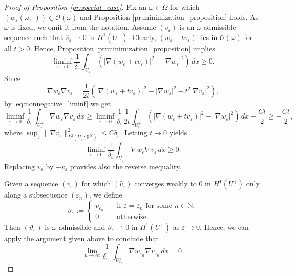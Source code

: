 \documentclass{article}
\numberwithin{equation}{section}
\theoremstyle{definition}
\theoremstyle{remark}
\begin{document}
\begin{proof}[Proof of Proposition \ref{pr:special_case}]
    Fix an $\omega \in \Omega$ for which $(w_\varepsilon(\omega, \cdot)) \in \mathcal{O}(\omega)$ and Proposition \ref{pr:minimization_proposition} holds. As $\omega$ is fixed, we omit it from the notation. Assume $(v_\varepsilon)$ is an $\omega$-admissible sequence such that $\hat{v}_\varepsilon \rightharpoonup 0$ in $H^1(U^+)$. Clearly, $(w_\varepsilon + tv_\varepsilon)$ lies in $\mathcal{O}(\omega)$ for all $t > 0$. Hence, Proposition \ref{pr:minimization_proposition} implies
        \begin{equation} \label{eq:nonnegative_liminf}
            \liminf_{\varepsilon \to 0} \frac{1}{\delta_\varepsilon} \int_{U_\varepsilon^+} (|\nabla (w_\varepsilon + tv_\varepsilon)|^2 - |\nabla w_\varepsilon|^2) \, dx \ge 0.
        \end{equation}
    Since
    \[
    \nabla w_\varepsilon \nabla v_\varepsilon = \frac{1}{2t}\left(|\nabla (w_\varepsilon + tv_\varepsilon)|^2 - |\nabla w_\varepsilon|^2 - t^2|\nabla v_\varepsilon|^2\right),
    \]
    by \eqref{eq:nonnegative_liminf} we get
    \[
    \liminf_{\varepsilon \to 0} \frac{1}{\delta_\varepsilon} \int_{U_\varepsilon^+} \nabla w_\varepsilon \nabla v_\varepsilon \, dx \ge \liminf_{\varepsilon \to 0} \frac{1}{\delta_\varepsilon} \frac{1}{2t} \int_{U_\varepsilon^+} (|\nabla (w_\varepsilon + tv_\varepsilon)|^2 - |\nabla w_\varepsilon|^2) \, dx - \frac{Ct}{2} \ge -\frac{Ct}{2},
    \]
    where $\sup_{\varepsilon} \|\nabla v_\varepsilon\|_{L^2(U_\varepsilon^+; \mathbb{R}^N)}^2 \le C \delta_\varepsilon$. Letting $t \to 0$ yields
    \[
    \liminf_{\varepsilon \to 0} \frac{1}{\delta_\varepsilon} \int_{U_\varepsilon^+} \nabla w_\varepsilon \nabla v_\varepsilon \, dx \ge 0.
    \]
    Replacing $v_\varepsilon$ by $-v_\varepsilon$ provides also the reverse inequality.

    Given a sequence $(v_\varepsilon)$ for which $(\hat{v}_\varepsilon)$ converges weakly to $0$ in $H^1(U^+)$ only along a subsequence $(\varepsilon_n)$, we define
    \[
    \vartheta_\varepsilon :=
        \begin{cases}
            v_{\varepsilon_n} \quad &\text{if } \varepsilon = \varepsilon_n \text{ for some } n \in \mathbb{N}, \\
            0 \quad &\text{otherwise}.
        \end{cases}
    \]
    Then $(\vartheta_\varepsilon)$ is $\omega$-admissible and $\vartheta_\varepsilon \rightharpoonup 0$ in $H^1(U^+)$ as $\varepsilon \to 0$. Hence, we can apply the argument given above to conclude that
    \[
    \lim_{n \to \infty} \frac{1}{\delta_{\varepsilon_n}} \int_{U_{\varepsilon_n}^+} \nabla w_{\varepsilon_n} \nabla v_{\varepsilon_n} \, dx = 0.
    \]    
\end{proof}
\end{document}
